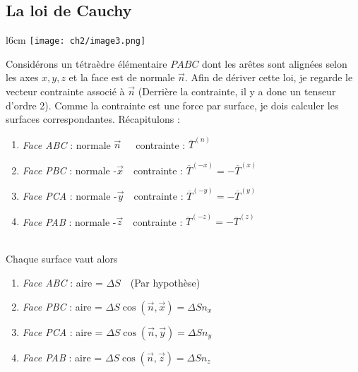     \subsection{La loi de Cauchy}
    \begin{wrapfigure}[12]{l}{6cm}
    \texttt{[image: ch2/image3.png]}
    \end{wrapfigure}
    Considérons un tétraèdre élémentaire $PABC$ dont les arêtes sont alignées selon les axes $x,y,z$
    et la face est de normale $\vec{n} $. Afin de dériver cette loi, je regarde le vecteur contrainte
    associé à $\vec n$ (Derrière la contrainte, il y a donc un tenseur d'ordre 2). Comme la contrainte
    est une force par surface, je dois calculer les surfaces correspondantes. Récapitulons :
    \begin{enumerate}
    \item \textit{Face ABC} : normale $\vec{n} $\ \ \ contrainte : $\overline{T}^{(n)}$
    \item \textit{Face PBC} : normale -$\vec{x} $\ \  contrainte : $\overline{T}^{(-x)} = -\overline{T}^{(x)}$
    \item \textit{Face PCA} : normale -$\vec{y} $\ \  contrainte : $\overline{T}^{(-y)} = -\overline{T}^{(y)}$
    \item \textit{Face PAB} : normale -$\vec{z} $\ \  contrainte : $\overline{T}^{(-z)} = -\overline{T}^{(z)}$
    \end{enumerate}\ \\ 
    Chaque surface vaut alors
    \begin{enumerate}
    \item \textit{Face ABC} : aire =  $\Delta S$\ \ (Par hypothèse)
    \item \textit{Face PBC} : aire =  $\Delta S\cos(\vec{n},\vec{x}) = \Delta S n_x$
    \item \textit{Face PCA} : aire =  $\Delta S\cos(\vec{n},\vec{y}) = \Delta S n_y$
    \item \textit{Face PAB} : aire =  $\Delta S\cos(\vec{n},\vec{z}) = \Delta S n_z$
    \end{enumerate}
    
